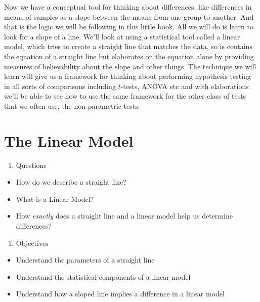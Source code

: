 \documentclass[
]{book}
\providecommand{\tightlist}{%
  \setlength{\itemsep}{0pt}\setlength{\parskip}{0pt}}
\begin{document}
Now we have a conceptual tool for thinking about differences, like differences in means of samples as a slope between the means from one group to another. And that is the logic we will be following in this little book. All we will do is learn to look for a slope of a line. We'll look at using a statistical tool called a linear model, which tries to create a straight line that matches the data, so is contains the equation of a straight line but elaborates on the equation alone by providing measures of believability about the slope and other things. The technique we will learn will give us a framework for thinking about performing hypothesis testing in all sorts of comparisons including \(t\)-tests, ANOVA etc and with elaborations we'll be able to see how to use the same framework for the other class of tests that we often use, the non-parametric tests.

\hypertarget{the-linear-model}{%
\chapter{The Linear Model}\label{the-linear-model}}

\begin{enumerate}
\def\labelenumi{\arabic{enumi}.}
\tightlist
\item
  Questions
\end{enumerate}

\begin{itemize}
\tightlist
\item
  How do we describe a straight line?
\item
  What is a Linear Model?
\item
  How \emph{exactly} does a straight line and a linear model help us determine differences?
\end{itemize}

\begin{enumerate}
\def\labelenumi{\arabic{enumi}.}
\setcounter{enumi}{1}
\tightlist
\item
  Objectives
\end{enumerate}

\begin{itemize}
\tightlist
\item
  Understand the parameters of a straight line
\item
  Understand the statistical components of a linear model
\item
  Understand how a sloped line implies a difference in a linear model
\end{itemize}
\end{document}
